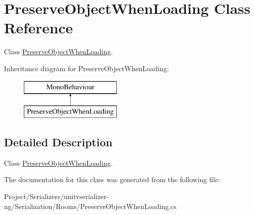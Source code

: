 \hypertarget{class_preserve_object_when_loading}{}\section{Preserve\+Object\+When\+Loading Class Reference}
\label{class_preserve_object_when_loading}


Class \hyperlink{class_preserve_object_when_loading}{Preserve\+Object\+When\+Loading}.  


Inheritance diagram for Preserve\+Object\+When\+Loading\+:\begin{figure}[H]
\begin{center}
\leavevmode
\includegraphics[height=2.000000cm]{class_preserve_object_when_loading}
\end{center}
\end{figure}


\subsection{Detailed Description}
Class \hyperlink{class_preserve_object_when_loading}{Preserve\+Object\+When\+Loading}. 



The documentation for this class was generated from the following file\+:\begin{DoxyCompactItemize}
\item 
Project/\+Serializers/unityserializer-\/ng/\+Serialization/\+Rooms/Preserve\+Object\+When\+Loading.\+cs\end{DoxyCompactItemize}
